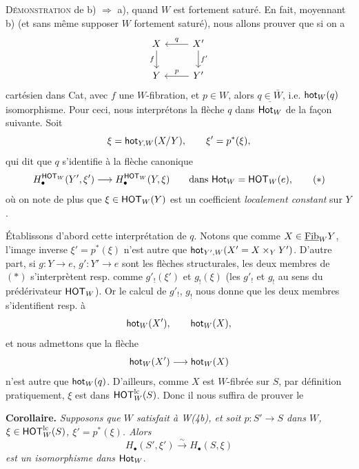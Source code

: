 \textsc{Démonstration} de b) $\Longrightarrow$ a), quand $W$ est fortement saturé. En fait, moyennant b) (et sans même supposer $W$ fortement saturé), nous allons prouver que si on a
\[
\begin{tikzcd}
X & X' \arrow[l,"q"'] \arrow[d,"f'"] \\
Y \arrow[from=u,"f"'] & Y' \arrow[l,"p"']
\end{tikzcd}
\]
cartésien dans Cat, avec
$f$ une $W$-fibration, et $p \in W$, alors $\underline{q \in \bar{W}}$, i.e. $\mathsf{hot}_W(q)$ isomorphisme. Pour ceci, nous interprétons la flèche $q$ dans $\mathsf{Hot}_W$ de la façon suivante. Soit
\[
\xi = \mathsf{hot}_{Y,W}(X/Y), \qquad \xi' = p^*(\xi),
\]
qui dit que $q$ s'identifie à la flèche canonique
\[
H_\bullet^{\HOT_W}(Y',\xi') \longrightarrow H_\bullet^{\HOT_W}(Y,\xi) \qquad \text{dans } \Hot_W = \HOT_W(e), \tag*{$(*)$}
\]
où on note de plus que $\xi \in \mathsf{HOT}_W(Y)$ est un coefficient \textit{localement constant} sur $Y$.

Établissons d'abord cette interprétation de $q$. Notons que comme $X \in \underline{\mathrm{Fib}}_W Y$, l'image inverse $\xi' = p^*(\xi)$ n'est autre que $\mathsf{hot}_{Y',W}(X' = X \times_Y Y')$. D'autre part, si $g : Y \longrightarrow e$, $g' : Y' \longrightarrow e$ sont les flèches structurales, les deux membres de $(*)$ s'interprètent resp. comme $g'_!(\xi')$ et $g_!(\xi)$ (les $g'_!$ et $g_!$ au sens du prédérivateur $\mathsf{HOT}_W$). Or le calcul de $g'_!$, $g_!$ nous donne que les deux membres s'identifient resp. à
\[
\mathsf{hot}_W(X'), \qquad \mathsf{hot}_W(X),
\]
et nous admettons que la flèche
\[
\mathsf{hot}_W(X') \longrightarrow \mathsf{hot}_W(X)
\]
n'est autre que $\mathsf{hot}_W(q)$. D'ailleurs, comme $X$ est $W$-fibrée sur $S$, par définition pratiquement, $\xi$ est dans $\mathsf{HOT}^{\mathrm{lc}}_W(S)$. Donc il nous suffira de prouver le


\textbf{Corollaire.} \textit{Supposons que $W$ satisfait à W(4b), et soit $p : S' \longrightarrow S$ dans $W$, $\xi \in \mathsf{HOT}^{\mathrm{lc}}_W(S)$, $\xi' = p^*(\xi)$. Alors}
\[
H_\bullet(S',\xi') \xrightarrow{\ \sim\ } H_\bullet(S,\xi)
\]
\textit{est un isomorphisme dans} $\mathsf{Hot}_W$.

